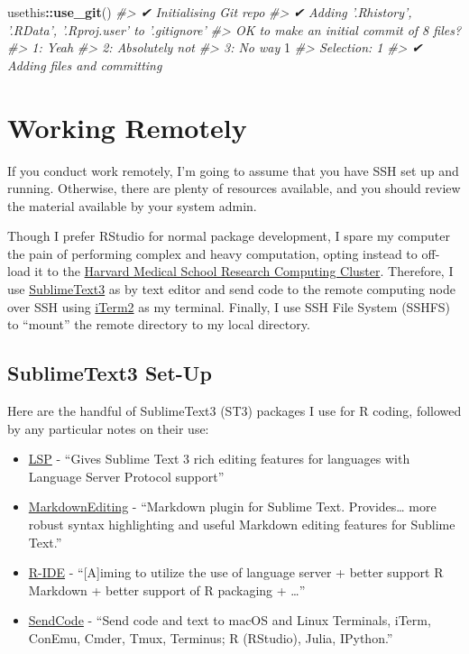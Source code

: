 \documentclass[]{book}
\newenvironment{Shaded}{\begin{snugshade}}{\end{snugshade}}
\newcommand{\CommentTok}[1]{\textcolor[rgb]{0.56,0.35,0.01}{\textit{#1}}}
\newcommand{\DecValTok}[1]{\textcolor[rgb]{0.00,0.00,0.81}{#1}}
\newcommand{\KeywordTok}[1]{\textcolor[rgb]{0.13,0.29,0.53}{\textbf{#1}}}
\newcommand{\NormalTok}[1]{#1}
\newcommand{\OperatorTok}[1]{\textcolor[rgb]{0.81,0.36,0.00}{\textbf{#1}}}
\providecommand{\tightlist}{%
  \setlength{\itemsep}{0pt}\setlength{\parskip}{0pt}}
\begin{document}
\begin{Shaded}
\begin{Highlighting}[]
\NormalTok{usethis}\OperatorTok{::}\KeywordTok{use_git}\NormalTok{()}
\CommentTok{#> ✔ Initialising Git repo}
\CommentTok{#> ✔ Adding '.Rhistory', '.RData', '.Rproj.user' to '.gitignore'}
\CommentTok{#> OK to make an initial commit of 8 files?}
\CommentTok{#> 1: Yeah}
\CommentTok{#> 2: Absolutely not}
\CommentTok{#> 3: No way}
\DecValTok{1}
\CommentTok{#> Selection: 1}
\CommentTok{#> ✔ Adding files and committing}
\end{Highlighting}
\end{Shaded}

\hypertarget{working-remotely}{%
\section{Working Remotely}\label{working-remotely}}

If you conduct work remotely, I'm going to assume that you have SSH set up and running. Otherwise, there are plenty of resources available, and you should review the material available by your system admin.

Though I prefer RStudio for normal package development, I spare my computer the pain of performing complex and heavy computation, opting instead to off-load it to the \href{https://rc.hms.harvard.edu}{Harvard Medical School Research Computing Cluster}. Therefore, I use \href{https://www.sublimetext.com}{SublimeText3} as by text editor and send code to the remote computing node over SSH using \href{https://iterm2colorschemes.com}{iTerm2} as my terminal. Finally, I use SSH File System (SSHFS) to ``mount'' the remote directory to my local directory.

\hypertarget{sublimetext3-set-up}{%
\subsection{SublimeText3 Set-Up}\label{sublimetext3-set-up}}

Here are the handful of SublimeText3 (ST3) packages I use for R coding, followed by any particular notes on their use:

\begin{itemize}
\tightlist
\item
  \href{https://packagecontrol.io/packages/LSP}{LSP} - ``Gives Sublime Text 3 rich editing features for languages with Language Server Protocol support''
\item
  \href{https://packagecontrol.io/packages/MarkdownEditing}{MarkdownEditing} - ``Markdown plugin for Sublime Text. Provides\ldots{} more robust syntax highlighting and useful Markdown editing features for Sublime Text.''
\item
  \href{https://packagecontrol.io/packages/R-IDE}{R-IDE} - ``{[}A{]}iming to utilize the use of language server + better support R Markdown + better support of R packaging + \ldots{}''
\item
  \href{https://packagecontrol.io/packages/SendCode}{SendCode} - ``Send code and text to macOS and Linux Terminals, iTerm, ConEmu, Cmder, Tmux, Terminus; R (RStudio), Julia, IPython.''
\end{itemize}
\end{document}
